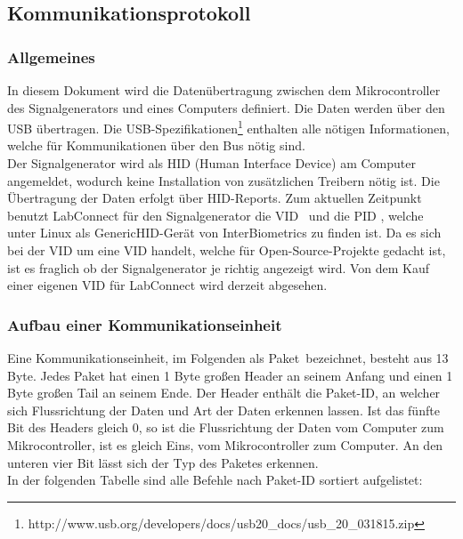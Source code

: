 \subsection{Kommunikationsprotokoll}
\subsubsection{Allgemeines}
In diesem Dokument wird die Datenübertragung zwischen dem Mikrocontroller des Signalgenerators und eines Computers definiert. Die Daten werden über den USB übertragen. Die USB-Spezifikationen\footnote{http://www.usb.org/developers/docs/usb20\_docs/usb\_20\_031815.zip} enthalten alle nötigen Informationen, welche für Kommunikationen über den Bus nötig sind.\\
Der Signalgenerator wird als HID (Human Interface Device) am Computer angemeldet, wodurch keine Installation von zusätzlichen Treibern nötig ist. Die Übertragung der Daten erfolgt über HID-Reports. Zum aktuellen Zeitpunkt benutzt LabConnect für den Signalgenerator die VID \VID\ und die PID \PID, welche unter Linux als GenericHID-Gerät von InterBiometrics zu finden ist. Da es sich bei der VID um eine VID handelt, welche für Open-Source-Projekte gedacht ist, ist es fraglich ob der Signalgenerator je richtig angezeigt wird. Von dem Kauf einer eigenen VID für LabConnect wird derzeit abgesehen.

\subsubsection{Aufbau einer Kommunikationseinheit}
Eine Kommunikationseinheit, im Folgenden als \glqq Paket\grqq\ bezeichnet, besteht aus 13 Byte. Jedes Paket hat einen 1 Byte großen Header an seinem Anfang und einen 1 Byte großen Tail an seinem Ende. Der Header enthält die Paket-ID, an welcher sich Flussrichtung der Daten und Art der Daten erkennen lassen. Ist das fünfte Bit des Headers gleich 0, so ist die Flussrichtung der Daten vom Computer zum Mikrocontroller, ist es gleich Eins, vom Mikrocontroller zum Computer. An den unteren vier Bit lässt sich der Typ des Paketes erkennen.\\
In der folgenden Tabelle sind alle Befehle nach Paket-ID sortiert aufgelistet:\\

